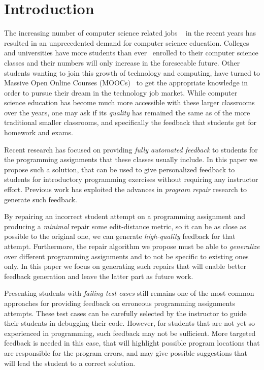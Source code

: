 \section{Introduction}
\label{sec:intro}

The increasing number of computer science related jobs
~\citep[][]{compsci-demand} in the recent years has resulted in an unprecedented
demand for computer science education. Colleges and universities have more
students than ever~\citep[][]{compsci-classes} enrolled to their computer
science classes and their numbers will only increase in the foreseeable future.
Other students wanting to join this growth of technology and computing, have
turned to Massive Open Online Courses (MOOCs)~\citep[][]{moocs} to get the
appropriate knowledge in order to pursue their dream in the technology job
market. While computer science education has become much more accessible with
these larger classrooms over the years, one may ask if its \emph{quality} has
remained the same as of the more traditional smaller classrooms, and
specifically the feedback that students get for homework and exams.

Recent research has focused on providing \emph{fully automated feedback} to
students for the programming assignments that these classes usually include. In
this paper we propose such a solution, that can be used to give personalized
feedback to students for introductory programming exercises without requiring
any instructor effort. Previous work has exploited the advances in \emph{program
repair} research to generate such feedback.

By repairing an incorrect student attempt on a programming assignment and
producing a \emph{minimal} repair \wrt some edit-distance metric, so it can be
as close as possible to the original one, we can generate \emph{high-quality}
feedback for that attempt. Furthermore, the repair algorithm we propose must be
able to \emph{generalize} over different programming assignments and to not be
specific to existing ones only. In this paper we focus on generating such
repairs that will enable better feedback generation and leave the latter part as
future work.

Presenting students with \emph{failing test cases} still remains one of the most
common approaches for providing feedback on erroneous programming assignments
attempts. These test cases can be carefully selected by the instructor to guide
their students in debugging their code. However, for students that are not yet
so experienced in programming, such feedback may not be sufficient. More
targeted feedback is needed in this case, that will highlight possible program
locations that are responsible for the program errors, and may give possible
suggestions that will lead the student to a correct solution.

